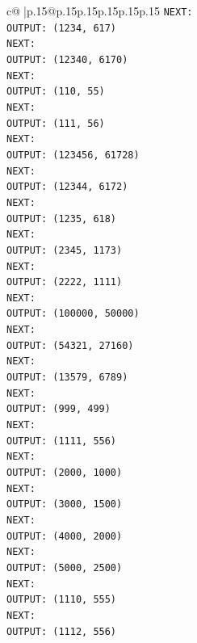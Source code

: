 \documentclass{article}
\begin{document}
{\begin{supertabular}{c@{$\;$}|p{.15\linewidth}@{}p{.15\linewidth}p{.15\linewidth}p{.15\linewidth}p{.15\linewidth}p{.15\linewidth}}
{{{\texttt{NEXT:} \\
\texttt{OUTPUT: (1234, 617)} \\
\texttt{NEXT:} \\
\texttt{OUTPUT: (12340, 6170)} \\
\texttt{NEXT:} \\
\texttt{OUTPUT: (110, 55)} \\
\texttt{NEXT:} \\
\texttt{OUTPUT: (111, 56)} \\
\texttt{NEXT:} \\
\texttt{OUTPUT: (123456, 61728)} \\
\texttt{NEXT:} \\
\texttt{OUTPUT: (12344, 6172)} \\
\texttt{NEXT:} \\
\texttt{OUTPUT: (1235, 618)} \\
\texttt{NEXT:} \\
\texttt{OUTPUT: (2345, 1173)} \\
\texttt{NEXT:} \\
\texttt{OUTPUT: (2222, 1111)} \\
\texttt{NEXT:} \\
\texttt{OUTPUT: (100000, 50000)} \\
\texttt{NEXT:} \\
\texttt{OUTPUT: (54321, 27160)} \\
\texttt{NEXT:} \\
\texttt{OUTPUT: (13579, 6789)} \\
\texttt{NEXT:} \\
\texttt{OUTPUT: (999, 499)} \\
\texttt{NEXT:} \\
\texttt{OUTPUT: (1111, 556)} \\
\texttt{NEXT:} \\
\texttt{OUTPUT: (2000, 1000)} \\
\texttt{NEXT:} \\
\texttt{OUTPUT: (3000, 1500)} \\
\texttt{NEXT:} \\
\texttt{OUTPUT: (4000, 2000)} \\
\texttt{NEXT:} \\
\texttt{OUTPUT: (5000, 2500)} \\
\texttt{NEXT:} \\
\texttt{OUTPUT: (1110, 555)} \\
\texttt{NEXT:} \\
\texttt{OUTPUT: (1112, 556)} \\
}}}
\end{supertabular}}
\end{document}

